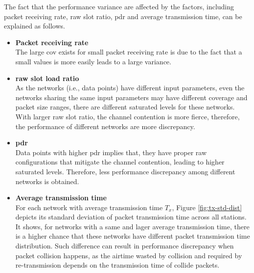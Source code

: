 The fact that the performance variance are affected by the factors, including packet receiving rate, \gls{raw} slot ratio, \gls{pdr} and average transmission time, can be explained as follows. 
 \begin{itemize}
 \item \textbf{Packet receiving rate} \\
 The large \gls{cov} exists for small packet receiving rate is due to the fact that a small values is more easily leads to a large variance.
 \item  \textbf{\gls{raw} slot load ratio} \\
 As the networks (i.e., data points) have different input parameters, even the networks sharing the same input parameters may have different coverage and packet size ranges, there are different saturated levels for these networks. With larger \gls{raw} slot ratio, the channel contention is more fierce, therefore, the performance of different networks are more discrepancy.
 \item \textbf{\gls{pdr}} \\
 Data points with higher \gls{pdr} implies that, they have proper \gls{raw} configurations that mitigate the channel contention, leading to higher saturated levels. Therefore, less performance discrepancy among different networks is obtained.
 \item \textbf{Average transmission time} \\
 For each network with average transmission time $T_x$, Figure \ref{fig:tx-std-dist} depicts its standard deviation of packet transmission time across all stations. It shows, for networks with a same and lager average transmission time, there is a higher chance that these networks have different packet transmission time distribution. Such difference can result in performance discrepancy when packet collision happens, as the airtime wasted by collision and required by re-transmission depends on the transmission time of collide packets.
  \end{itemize}


